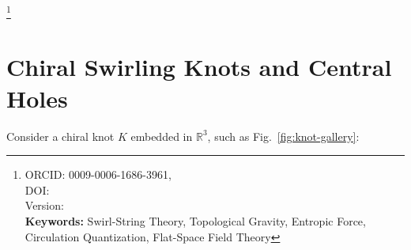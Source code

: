 \documentclass[reprint,aps,onecolumn,nofootinbib]{revtex4-2}
\newcommand{\swirlarrow}{%
    \mathchoice{\mkern-2mu\scriptstyle\boldsymbol{\circlearrowleft}}%
    {\mkern-2mu\scriptstyle\boldsymbol{\circlearrowleft}}%
    {\mkern-2mu\scriptscriptstyle\boldsymbol{\circlearrowleft}}%
    {\mkern-2mu\scriptscriptstyle\boldsymbol{\circlearrowleft}}%
}
\newcommand{\SwirlClock}{S_{(t)}^{\swirlarrow}}
\begin{document}
    \title{\papertitle }
    \author{Omar Iskandarani}
    \thanks{ORCID: 0009-0006-1686-3961,\\
            DOI: \paperdoi \\
            Version: \paperversion \\
    \textbf{Keywords:} Swirl-String Theory, Topological Gravity, Entropic Force, Circulation Quantization, Flat-Space Field Theory
    }
    \date{\today}

    \begin{abstract}
    In Swirl–String Theory (SST), long-range attraction arises from the topology of \emph{chiral swirling knots}—vortex filaments including the trefoil (\(3_1\)), cinquefoil (\(5_1\)), \(5_2\), and stevedore (\(6_1\)). Each knot surrounds a straight rotation axis that carries the circulation. By Cauchy’s integral theorem~\cite{ahlforsComplexAnalysis1979,cauchy1825}, loops that link this axis exhibit an integer plateau of circulation, which we record with the Swirl Clock \(\SwirlClock\). When two composite tubes (e.g., the proton cores in H\(_2\)) share a central axis across an equal-pressure boundary, additive circulation deepens the common pressure well, consistent with attraction between neutral molecules in flat space~\cite{london1930,casimirpolder1948}. A crisp laboratory discriminator follows from the swirl–EM correspondence: topology changes in the swirl network generate geometry-independent, discrete electromotive impulses of fixed magnitude, \(\Delta\Phi=\pm\Phi_\star\)~\cite{DeaverFairbank1961,LittleParks1962}, with sign set by chirality. Non-integral steps, geometry-dependent amplitudes, or persistence without verified linking would falsify this mechanism.
    \end{abstract}
    \maketitle

\section{Chiral Swirling Knots and Central Holes}
    Consider a chiral knot $K$ embedded in $\mathbb{R}^3$, such as Fig.~\ref{fig:knot-gallery}:
\end{document}
